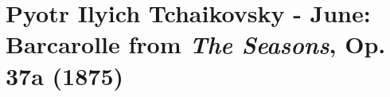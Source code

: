 \chapter[Tchaikovsky and \textit{The Seasons}, Op. 37a]{Pyotr Ilyich Tchaikovsky - June: Barcarolle from \textit{The Seasons}, Op. 37a (1875)}